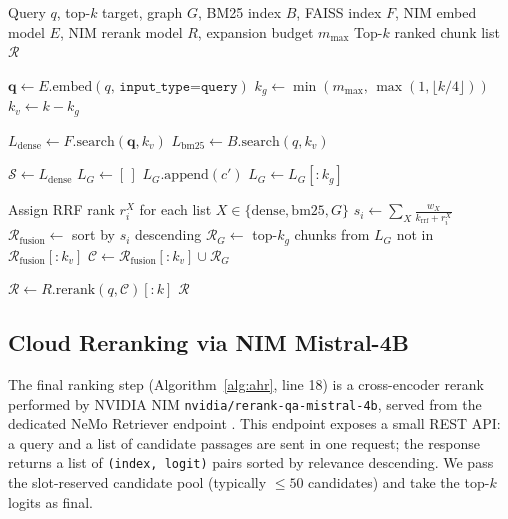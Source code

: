 \documentclass[journal]{IEEEtran}
\begin{document}
\begin{algorithm}[!t]
\caption{Adaptive Hybrid Retrieval (AHR)}
\label{alg:ahr}
\begin{algorithmic}[1]
\Require Query $q$, top-$k$ target, graph $G$, BM25 index $B$,
         FAISS index $F$, NIM embed model $E$, NIM rerank model $R$,
         expansion budget $m_{\max}$
\Ensure Top-$k$ ranked chunk list $\mathcal{R}$

\State $\mathbf{q} \gets E.\mathrm{embed}(q,\, \texttt{input\_type=query})$
\State $k_g \gets \min(m_{\max},\, \max(1, \lfloor k/4 \rfloor))$
\State $k_v \gets k - k_g$ 

\State $L_{\mathrm{dense}} \gets F.\mathrm{search}(\mathbf{q}, k_v)$
\State $L_{\mathrm{bm25}}  \gets B.\mathrm{search}(q, k_v)$

\State $\mathcal{S} \gets L_{\mathrm{dense}}$ 
\State $L_G \gets [\,]$
      \State $L_G.\mathrm{append}(c')$
    \EndIf
  \EndFor
\EndFor
\State $L_G \gets L_G[:k_g]$ 

\State Assign RRF rank $r^X_i$ for each list $X \in \{\mathrm{dense},\mathrm{bm25}, G\}$
  \State $s_i \gets \sum_{X} \tfrac{w_X}{k_{\mathrm{rrf}}+r^X_i}$
\EndFor
\State $\mathcal{R}_{\mathrm{fusion}} \gets$ sort by $s_i$ descending
\State $\mathcal{R}_G \gets$ top-$k_g$ chunks from $L_G$ not in $\mathcal{R}_{\mathrm{fusion}}[:k_v]$
\State $\mathcal{C} \gets \mathcal{R}_{\mathrm{fusion}}[:k_v] \cup \mathcal{R}_G$

\State $\mathcal{R} \gets R.\mathrm{rerank}(q, \mathcal{C})[:k]$
\State \Return $\mathcal{R}$
\end{algorithmic}
\end{algorithm}

\subsection{Cloud Reranking via NIM Mistral-4B}
\label{sec:rerank}
The final ranking step (Algorithm~\ref{alg:ahr}, line 18) is a
cross-encoder rerank performed by NVIDIA NIM
\texttt{nvidia/rerank-qa-mistral-4b}, served from the dedicated
NeMo Retriever endpoint
. This
endpoint exposes a small REST API: a query and a list of candidate
passages are sent in one request; the response returns a list of
\texttt{(index, logit)} pairs sorted by relevance descending. We pass
the slot-reserved candidate pool (typically $\leq 50$ candidates) and
take the top-$k$ logits as final.
\end{document}
